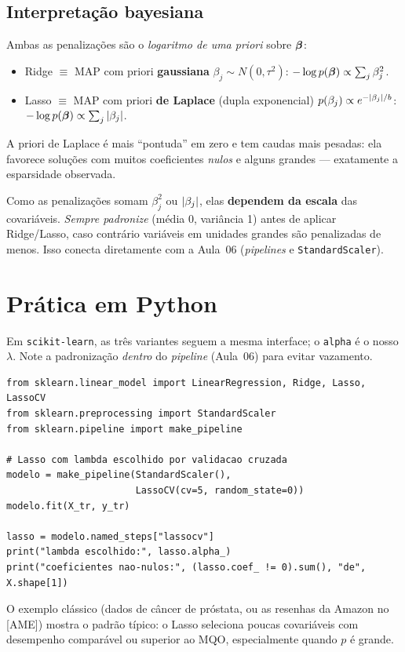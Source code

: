 \documentclass[11pt,a4paper]{article}
\begin{document}
\subsection{Interpretação bayesiana}
Ambas as penalizações são o \emph{logaritmo de uma priori} sobre $\bm{\beta}$:
\begin{itemize}[leftmargin=1.4cm]
  \item Ridge $\equiv$ MAP com priori \textbf{gaussiana}
        $\beta_j\sim N(0,\tau^2)$: $-\log p(\bm{\beta})\propto \sum_j\beta_j^2$.
  \item Lasso $\equiv$ MAP com priori \textbf{de Laplace} (dupla exponencial)
        $p(\beta_j)\propto e^{-\left\lvert \beta_j \right\rvert/b}$: $-\log p(\bm{\beta})\propto
        \sum_j\left\lvert \beta_j \right\rvert$.
\end{itemize}
A priori de Laplace é mais ``pontuda'' em zero e tem caudas mais pesadas: ela
favorece soluções com muitos coeficientes \emph{nulos} e alguns grandes --- exatamente
a esparsidade observada.

\begin{atencao}
Como as penalizações somam $\beta_j^2$ ou $\left\lvert \beta_j \right\rvert$, elas \textbf{dependem da
escala} das covariáveis. \emph{Sempre padronize} (média 0, variância 1) antes de
aplicar Ridge/Lasso, caso contrário variáveis em unidades grandes são penalizadas
de menos. Isso conecta diretamente com a Aula~06 (\emph{pipelines} e
\texttt{StandardScaler}).
\end{atencao}

\section{Prática em Python}
Em \texttt{scikit-learn}, as três variantes seguem a mesma interface; o
\texttt{alpha} é o nosso $\lambda$. Note a padronização \emph{dentro} do
\emph{pipeline} (Aula~06) para evitar vazamento.
\begin{lstlisting}
from sklearn.linear_model import LinearRegression, Ridge, Lasso, LassoCV
from sklearn.preprocessing import StandardScaler
from sklearn.pipeline import make_pipeline

# Lasso com lambda escolhido por validacao cruzada
modelo = make_pipeline(StandardScaler(),
                       LassoCV(cv=5, random_state=0))
modelo.fit(X_tr, y_tr)

lasso = modelo.named_steps["lassocv"]
print("lambda escolhido:", lasso.alpha_)
print("coeficientes nao-nulos:", (lasso.coef_ != 0).sum(), "de", X.shape[1])
\end{lstlisting}
O exemplo clássico (dados de câncer de próstata, ou as resenhas da Amazon no [AME])
mostra o padrão típico: o Lasso seleciona poucas covariáveis com desempenho
comparável ou superior ao MQO, especialmente quando $p$ é grande.
\end{document}
